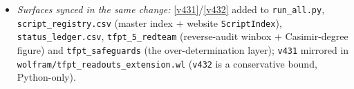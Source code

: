 \begin{itemize}
downstream witness) gives a floor $\le10^{-6}$ across a grid of generous assignments, nominal
$\sim10^{-10}$. \mE\ that floor sits $\sim20$ orders \emph{above} the \vref{v100} conditional $10^{-30.7}$;
the gap is exactly the evidential value of proving the forms forced, so the $\alpha$ form-derivation
(\texttt{ALPHA.QUILLEN.EXACT.01}, \vref{v382}) and this floor are the \emph{same} lever. \mC\ \textbf{honest
scope:} bounds only the ``is it numerology?'' question, not the physics bridge (firewall \vref{v187}); a
conservative floor, not a posterior.
\item \emph{Surfaces synced in the same change:} \vref{v431}/\vref{v432} added to \texttt{run\_all.py},
\texttt{script\_registry.csv} (master index $+$ website \texttt{ScriptIndex}), \texttt{status\_ledger.csv},
\texttt{tfpt\_5\_redteam} (reverse-audit winbox $+$ Casimir-degree figure) and \texttt{tfpt\_safeguards}
(the over-determination layer); \texttt{v431} mirrored in
\texttt{wolfram/tfpt\_readouts\_extension.wl} (\texttt{v432} is a conservative bound, Python-only).
\end{itemize}


